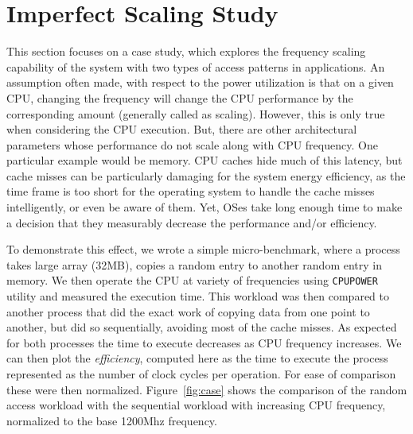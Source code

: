\section{Imperfect Scaling Study}\label{sec:case-study}

This section focuses on a case study, which explores the frequency scaling 
capability of the system with two types of access patterns in applications.
An assumption often made, with respect to the power utilization 
is that on a given CPU, changing the frequency will change the CPU performance by the corresponding amount (generally called as scaling).
However, this is only true when considering the CPU execution. 
But, there are other architectural parameters whose performance do not scale along with CPU frequency.
One particular example would be memory. CPU caches hide much of this latency, but cache misses can be particularly damaging for the system energy efficiency,
as the time frame is too short for the operating system to handle the cache misses intelligently, or even be aware of them.
Yet, OSes take long enough time to make a decision that they measurably decrease the performance and/or efficiency.
 
To demonstrate this effect, we wrote a simple micro-benchmark, where a process takes large array (32MB), 
copies a random entry to another random entry in memory. 
We then operate the CPU at variety of frequencies using \texttt{CPUPOWER}~\cite{cpupower} utility and measured the execution time.  
This workload was then compared to another process that did the exact work of copying data from one point to another, but did so sequentially, avoiding most of the cache misses. 
As expected for both processes the time to execute decreases as CPU frequency increases.
We can then plot the \emph{efficiency}, computed  here as the time to execute the process
represented as the number of clock cycles per operation. For ease of comparison these were then normalized.
Figure~\ref{fig:case} shows the comparison of the random access workload with the sequential workload with increasing CPU frequency, normalized
to the base 1200Mhz frequency. 

